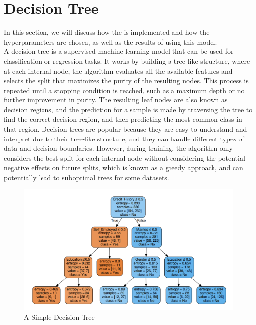 \section{Decision Tree}
In this section, we will discuss how the  is implemented and how the hyperparameters are chosen, as well as the results of using this model.\\

A decision tree is a supervised machine learning model that can be used for classification or regression tasks.
It works by building a tree-like structure, where at each internal node, the algorithm evaluates all the available features and selects the split that maximizes the purity of the resulting nodes.
This process is repeated until a stopping condition is reached, such as a maximum depth or no further improvement in purity.
The resulting leaf nodes are also known as decision regions, and the prediction for a sample is made by traversing the tree to find the correct decision region, and then predicting the most common class in that region.
Decision trees are popular because they are easy to understand and interpret due to their tree-like structure, and they can handle different types of data and decision boundaries.
However, during training, the algorithm only considers the best split for each internal node without considering the potential negative effects on future splits, which is known as a greedy approach, and can potentially lead to suboptimal trees for some datasets.

\begin{figure}[H]
    \centering
    \includegraphics[scale=0.25]{figures_for_report/example_decision_tree}
    \captionsetup{justification=centering,margin=2cm}
    \caption{A Simple Decision Tree}
\end{figure}


